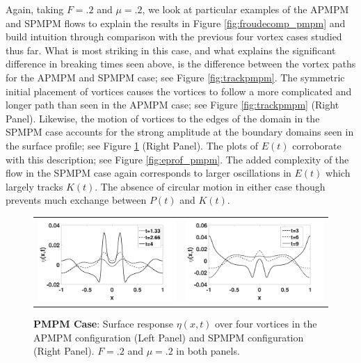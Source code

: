\documentclass[a4paper,11pt]{article}
\begin{document}
Again, taking $F=.2$ and $\mu=.2$, we look at particular examples of the APMPM and SPMPM flows to explain the results in Figure \ref{fig:froudecomp_pmpm} and build intuition through comparison with the previous four vortex cases studied thus far.  What is most striking in this case, and what explains the significant difference in breaking times seen above, is the difference between the vortex paths for the APMPM and SPMPM case; see Figure \ref{fig:trackpmpm}.  The symmetric initial placement of vortices causes the vortices to follow a more complicated and longer path than seen in the APMPM case; see Figure \ref{fig:trackpmpm} (Right Panel).  Likewise, the motion of vortices to the edges of the domain in the SPMPM case accounts for the strong amplitude at the boundary domains seen in the surface profile; see Figure \ref{fig:surfrepmpm} (Right Panel).  The plots of $E(t)$ corroborate with this description; see Figure \ref{fig:eprof_pmpm}.  The added complexity of the flow in the SPMPM case again corresponds to larger oscillations in $E(t)$ which largely tracks $K(t)$.  The absence of circular motion in either case though prevents much exchange between $P(t)$ and $K(t)$.  
\begin{figure}[!h]
\centering
\begin{tabular}{cc}
\includegraphics[width=.5\textwidth]{surf_resp_mu_pt2_F_pt2_pmpm} & 
\includegraphics[width=.5\textwidth]{surf_resp_mu_pt2_F_pt2_pmpm_sym}
\end{tabular}
\caption{\small {\bf PMPM Case}: Surface response $\eta(x,t)$ over four vortices in the APMPM configuration (Left Panel) and SPMPM configuration (Right Panel).  $F=.2$ and $\mu=.2$ in both panels.}
\label{fig:surfrepmpm}
\end{figure}
\end{document}
